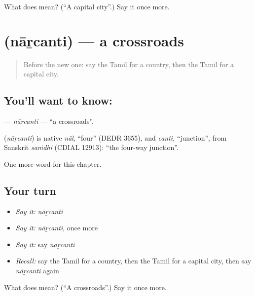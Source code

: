 \begin{tcolorbox}[breakable,colback=teal!4,colframe=teal!35!black,title={Before you move on}]
What does  mean? (\textquotedblleft{}A capital city\textquotedblright{}.) Say it once more.
\end{tcolorbox}
\section[\texorpdfstring{\ta{நாற்சந்தி} (nāṟcanti)}{நாற்சந்தி (nāṟcanti)}]{ (nāṟcanti) — a crossroads}

\label{lesson:TA-C234-narcanti}



\begin{quote}
Before the new one: say the Tamil for a country, then the Tamil for a capital city.
\end{quote}

\subsection*{You'll want to know: }
\textbf{} — \emph{nāṟcanti} — \textquotedblleft{}a crossroads\textquotedblright{}.

\begin{cousinweb}
\textbf{} (\emph{nāṟcanti}) is native \emph{nāl}, \textquotedblleft{}four\textquotedblright{} (DEDR 3655), and \emph{canti}, \textquotedblleft{}junction\textquotedblright{}, from Sanskrit \emph{saṁdhi} (CDIAL 12913): \textquotedblleft{}the four-way junction\textquotedblright{}.
\end{cousinweb}

\begin{grammarlens}[title={What you've built}]
One more word for this chapter.
\end{grammarlens}

\subsection*{Your turn}
\begin{itemize}
\raggedright
  \item \emph{Say it:} \emph{nāṟcanti}
  \item \emph{Say it:} \emph{nāṟcanti}, once more
  \item \emph{Say it:} say \emph{nāṟcanti}
  \item \emph{Recall:} say the Tamil for a country, then the Tamil for a capital city, then say \emph{nāṟcanti} again
\end{itemize}

\begin{tcolorbox}[breakable,colback=teal!4,colframe=teal!35!black,title={Before you move on}]
What does  mean? (\textquotedblleft{}A crossroads\textquotedblright{}.) Say it once more.
\end{tcolorbox}
